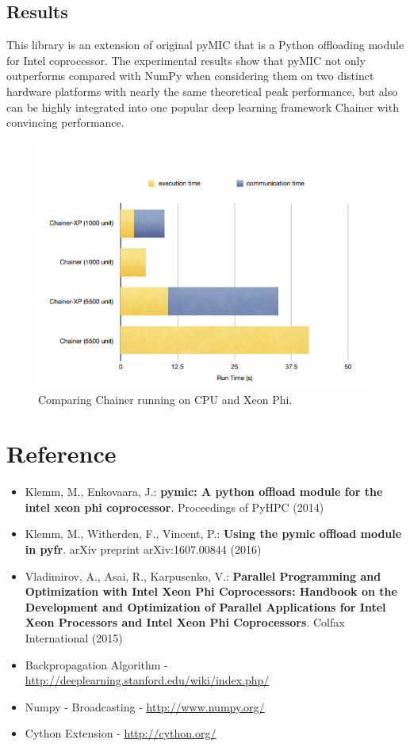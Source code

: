 \documentclass[12pt]{article}
\begin{document}
\subsection{Results}
This library is an extension of original pyMIC that is a Python offloading module for Intel coprocessor. The experimental results show that pyMIC not only outperforms compared with NumPy when considering them on two distinct hardware platforms with nearly the same theoretical peak performance, but also can be highly integrated into one popular deep learning framework Chainer with convincing performance.
\begin{figure}[H]
\centering
\includegraphics[scale = 0.9]{chainer30.png}
\caption{Comparing Chainer running on CPU and Xeon Phi.}
\end{figure}

\section{Reference}
\begin{itemize}
\item Klemm, M., Enkovaara, J.: \textbf{pymic: A python offload module for the intel xeon phi coprocessor}. Proceedings of PyHPC (2014)
\item Klemm, M., Witherden, F., Vincent, P.: \textbf{Using the pymic offload module in pyfr}. arXiv preprint arXiv:1607.00844 (2016)
\item Vladimirov, A., Asai, R., Karpusenko, V.: \textbf{Parallel Programming and Optimization with Intel Xeon Phi Coprocessors: Handbook on the Development and Optimization of Parallel Applications for Intel Xeon Processors and Intel Xeon Phi Coprocessors}. Colfax International (2015)
\item Backpropagation Algorithm - \url{http://deeplearning.stanford.edu/wiki/index.php/ }
\item Numpy - Broadcasting - \url{http://www.numpy.org/}
\item Cython Extension - \url{http://cython.org/}

\end{itemize}



\newpage


%
%
\end{document}
